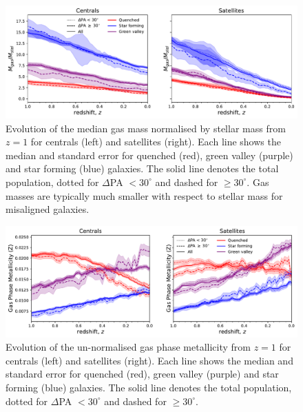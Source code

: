 \documentclass[fleqn,usenatbib]{mnras}
\begin{document}
\begin{figure}
	\includegraphics[width=\linewidth]{tng_results/gas_mass_timestep_norm_cen_sat.pdf}
    \caption{Evolution of the median gas mass normalised by stellar mass from $z=1$ for centrals (left) and satellites (right). Each line shows the median and standard error for quenched (red), green valley (purple) and star forming (blue) galaxies. The solid line denotes the total population, dotted for $\Delta$PA $< 30^{\circ}$ and dashed for $\geq 30^{\circ}$. Gas masses are typically much smaller with respect to stellar mass for misaligned galaxies.}
    \label{fig:gas_mass}
\end{figure}

\begin{figure}
	\includegraphics[width=\linewidth]{tng_results/gas_metallicity_nonorm_cen_sat.pdf}
    \caption{Evolution of the un-normalised gas phase metallicity from $z=1$ for centrals (left) and satellites (right). Each line shows the median and standard error for quenched (red), green valley (purple) and star forming (blue) galaxies. The solid line denotes the total population, dotted for $\Delta$PA $< 30^{\circ}$ and dashed for $\geq 30^{\circ}$.}
    \label{fig:gas_metallicity}
\end{figure}
\end{document}
